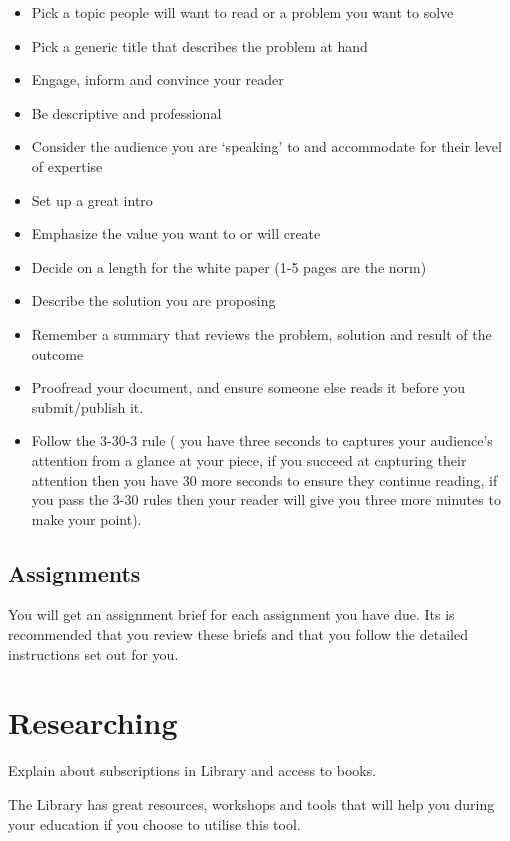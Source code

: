 \documentclass[]{book}
\providecommand{\tightlist}{%
  \setlength{\itemsep}{0pt}\setlength{\parskip}{0pt}}
\theoremstyle{definition}
\theoremstyle{definition}
\theoremstyle{remark}
\begin{document}
\begin{itemize}
\tightlist
\item
  Pick a topic people will want to read or a problem you want to solve
\item
  Pick a generic title that describes the problem at hand
\item
  Engage, inform and convince your reader
\item
  Be descriptive and professional
\item
  Consider the audience you are `speaking' to and accommodate for their
  level of expertise
\item
  Set up a great intro
\item
  Emphasize the value you want to or will create
\item
  Decide on a length for the white paper (1-5 pages are the norm)
\item
  Describe the solution you are proposing
\item
  Remember a summary that reviews the problem, solution and result of
  the outcome
\item
  Proofread your document, and ensure someone else reads it before you
  submit/publish it.
\item
  Follow the 3-30-3 rule ( you have three seconds to captures your
  audience's attention from a glance at your piece, if you succeed at
  capturing their attention then you have 30 more seconds to ensure they
  continue reading, if you pass the 3-30 rules then your reader will
  give you three more minutes to make your point).
\end{itemize}

\subsection{Assignments}\label{assignments}

You will get an assignment brief for each assignment you have due. Its
is recommended that you review these briefs and that you follow the
detailed instructions set out for you.

\section{Researching}\label{researching}

Explain about subscriptions in Library and access to books.

The Library has great resources, workshops and tools that will help you
during your education if you choose to utilise this tool.
\end{document}
